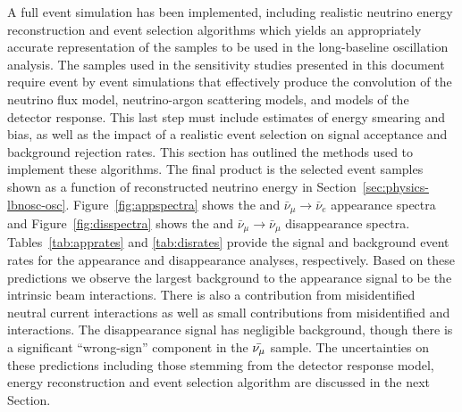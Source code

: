 A full event simulation has been implemented, including realistic neutrino energy reconstruction and event selection algorithms which yields an appropriately accurate representation of the  samples to be used in the long-baseline oscillation analysis. The samples used in the sensitivity studies presented in this document require event by event simulations that effectively produce the convolution of the neutrino flux model, neutrino-argon scattering models, and models of the detector response. This last step must include estimates of energy smearing and bias, as well as the impact of a realistic event selection on signal acceptance and background rejection rates. This section has outlined the methods used to implement these algorithms. The final product is the  selected  event samples shown as a function of reconstructed neutrino energy in Section~\ref{sec:physics-lbnosc-osc}. Figure~\ref{fig:appspectra} shows the \numutonue and $\bar{\nu}_\mu \to \bar{\nu}_e$ appearance spectra and Figure~\ref{fig:disspectra} shows the \numutonumu and  $\bar{\nu}_\mu \to \bar{\nu}_\mu$ disappearance spectra. Tables~\ref{tab:apprates} and \ref{tab:disrates} provide the signal and background event rates for the appearance and disappearance analyses, respectively. Based on these predictions we observe the largest background to the \nue {} appearance signal to be the intrinsic beam \nue interactions. There is also a contribution from misidentified neutral current interactions as well as small contributions from misidentified \numu and \nutau interactions. The \numu disappearance signal has negligible background, though there is a significant ``wrong-sign''  \numu component in the $\bar{\nu_\mu}$ sample. The uncertainties on these predictions including those stemming from the detector response model, energy reconstruction and event selection algorithm are discussed in the next Section.

